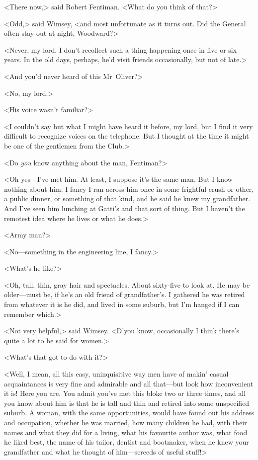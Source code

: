 <There now,> said Robert Fentiman. <What do you think of that?>

<Odd,> said Wimsey, <and most unfortunate as it turns out. Did the General often stay out at night, Woodward?>

<Never, my lord. I don't recollect such a thing happening once in five or six years. In the old days, perhaps, he'd visit friends occasionally, but not of late.>

<And you'd never heard of this Mr~Oliver?>

<No, my lord.>

<His voice wasn't familiar?>

<I couldn't say but what I might have heard it before, my lord, but I find it very difficult to recognize voices on the telephone. But I thought at the time it might be one of the gentlemen from the Club.>

<Do \emph{you} know anything about the man, Fentiman?>

<Oh yes—I've met him. At least, I suppose it's the same man. But I know nothing about him. I fancy I ran across him once in some frightful crush or other, a public dinner, or something of that kind, and he said he knew my grandfather. And I've seen him lunching at Gatti's and that sort of thing. But I haven't the remotest idea where he lives or what he does.>

<Army man?>

<No—something in the engineering line, I fancy.>

<What's he like?>

<Oh, tall, thin, gray hair and spectacles. About sixty-five to look at. He may be older—must be, if he's an old friend of grandfather's. I gathered he was retired from whatever it is he did, and lived in some suburb, but I'm hanged if I can remember which.>

<Not very helpful,> said Wimsey. <D'you know, occasionally I think there's quite a lot to be said for women.>

<What's that got to do with it?>

<Well, I mean, all this easy, uninquisitive way men have of makin' casual acquaintances is very fine and admirable and all that—but look how inconvenient it is! Here you are. You admit you've met this bloke two or three times, and all you know about him is that he is tall and thin and retired into some unspecified suburb. A woman, with the same opportunities, would have found out his address and occupation, whether he was married, how many children he had, with their names and what they did for a living, what his favourite author was, what food he liked best, the name of his tailor, dentist and bootmaker, when he knew your grandfather and what he thought of him—screeds of useful stuff!>

